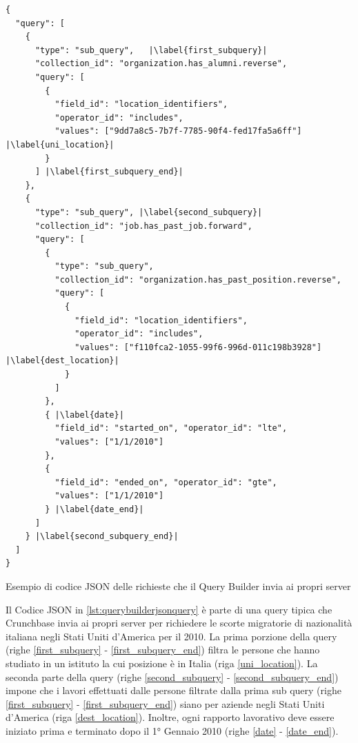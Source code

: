 
\begin{listing}
\begin{verbatim}
{
  "query": [                
    { 
      "type": "sub_query",   |\label{first_subquery}|
      "collection_id": "organization.has_alumni.reverse",
      "query": [
        {
          "field_id": "location_identifiers", 
          "operator_id": "includes",
          "values": ["9dd7a8c5-7b7f-7785-90f4-fed17fa5a6ff"]  |\label{uni_location}|
        }
      ] |\label{first_subquery_end}|
    }, 
    { 
      "type": "sub_query", |\label{second_subquery}|
      "collection_id": "job.has_past_job.forward",
      "query": [
        {
          "type": "sub_query", 
          "collection_id": "organization.has_past_position.reverse",
          "query": [
            {
              "field_id": "location_identifiers", 
              "operator_id": "includes",
              "values": ["f110fca2-1055-99f6-996d-011c198b3928"] |\label{dest_location}|
            }
          ]
        },
        { |\label{date}|
          "field_id": "started_on", "operator_id": "lte", 
          "values": ["1/1/2010"] 
        },
        {
          "field_id": "ended_on", "operator_id": "gte", 
          "values": ["1/1/2010"]
        } |\label{date_end}|
      ]
    } |\label{second_subquery_end}|
  ]
}
\end{verbatim}
\caption{Esempio di codice JSON delle richieste che il Query Builder invia ai propri server}
\label{lst:querybuilderjsonquery}
\end{listing}


Il Codice JSON in \ref{lst:querybuilderjsonquery} è parte di una query tipica che Crunchbase invia ai propri server per richiedere le scorte migratorie di nazionalità italiana negli Stati Uniti d'America per il 2010. La prima porzione della query (righe \ref{first_subquery} - \ref{first_subquery_end}) filtra le persone che hanno studiato in un istituto la cui posizione è in Italia (riga \ref{uni_location}).
La seconda parte della query (righe \ref{second_subquery} - \ref{second_subquery_end}) impone che i lavori effettuati dalle  persone filtrate dalla prima sub query (righe \ref{first_subquery} - \ref{first_subquery_end}) siano per aziende negli Stati Uniti d'America (riga \ref{dest_location}). Inoltre, ogni rapporto lavorativo deve essere iniziato prima e  terminato dopo il 1° Gennaio 2010 (righe \ref{date} - \ref{date_end}). 


